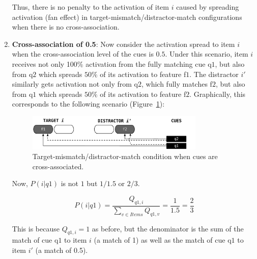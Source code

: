 \documentclass{cambridge7A}\usepackage[]{graphicx}\usepackage[]{color}
\begin{document}
\begin{enumerate}
Thus, there is no penalty to the activation of item $i$ caused by spreading activation (fan effect) in target-mismatch/distractor-match configurations when there is no cross-association. 

\item \textbf{Cross-association of 0.5}:
Now consider the activation spread to item $i$ when the cross-association level of the cues is $0.5$. Under this scenario, item $i$ receives not only 100\%  activation from the fully matching cue q$1$, but also from q$2$ which spreads $50\%$ of its activation to feature f$1$. The distractor $i'$ similarly gets activation not only from  q$2$, which fully matches  f$2$, but also from  q$1$ which spreads $50\%$ of its activation to feature f$2$.   Graphically, this corresponds to the following scenario (Figure~\ref{fig:implFig2}):

\begin{figure}[htbp]
	\centering
	\includegraphics[width=0.80\textwidth]{figures/implFig2}
	\caption{Target-mismatch/distractor-match condition when cues are cross-associated.}
	\label{fig:implFig2}
\end{figure}





Now, $P(i|q1)$ is not $1$ but $1/1.5$ or $2/3$.  

\begin{equation} \label{eq:newfannoxassoc3}
	P(i|q1) = \frac{Q_{q1,i}}{\sum\limits_{v\in Items} Q_{q1,v}} = \frac{1}{1.5} = \frac{2}{3}
\end{equation}

This is because $Q_{q1,i} = 1$  as before, but the denominator is the sum of the match of cue q$1$ to item $i$ (a match of 1) as well as the match of cue q$1$ to item $i'$ (a match of 0.5).


\end{enumerate}
\end{document}
